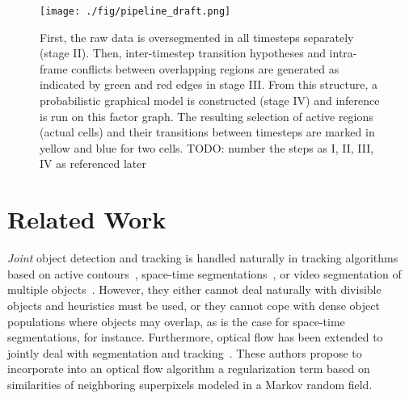 \documentclass[10pt,twocolumn,letterpaper]{article}
\newcommand{\red}{\color{red}}
\begin{document}
\begin{figure*}[t]
\begin{center}
\texttt{[image: ./fig/pipeline\_draft.png]}
\end{center}
   \caption{First, the raw data is oversegmented in all timesteps separately (stage II). Then, inter-timestep 
transition hypotheses and intra-frame conflicts between overlapping regions are generated as indicated
by green and red edges in stage III. From this structure, a probabilistic graphical model is constructed (stage IV)
and inference is run on this factor graph. The resulting selection of active regions (actual cells) and their transitions between
timesteps are marked in yellow and blue for two cells.
 {\red TODO: number the steps as I, II, III, IV as referenced later}
}
\label{fig:pipeline}
\end{figure*}


\section{Related Work}
\label{sec:related_work}

\emph{Joint} object detection and tracking is handled naturally in tracking algorithms
based on active contours~\cite{xiong_06_dynamical}, space-time segmentations~\cite{lezama_11_track}, or video segmentation of 
multiple objects~\cite{vazquez_10_multiple,budvytis_11_semi}. However, they either cannot deal naturally with divisible objects and 
heuristics must be used, or they cannot cope with dense object populations where objects may overlap, 
as is the case for space-time segmentations, for instance.
Furthermore, optical flow has been extended to jointly deal with segmentation and tracking~\cite{amat_13_fast}. 
These authors propose to incorporate into an optical flow algorithm a regularization term based on 
similarities of neighboring superpixels modeled in a Markov random field.
\end{document}
